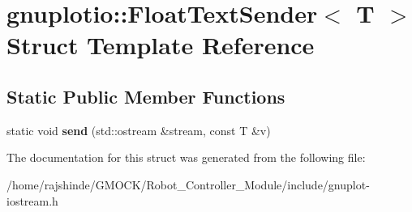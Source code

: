 \hypertarget{structgnuplotio_1_1_float_text_sender}{}\section{gnuplotio\+:\+:Float\+Text\+Sender$<$ T $>$ Struct Template Reference}
\label{structgnuplotio_1_1_float_text_sender}
\subsection*{Static Public Member Functions}
\begin{DoxyCompactItemize}
\item 
static void {\bfseries send} (std\+::ostream \&stream, const T \&v)\hypertarget{structgnuplotio_1_1_float_text_sender_aed6b6c3a95b1396688800d6d1f2fc299}{}\label{structgnuplotio_1_1_float_text_sender_aed6b6c3a95b1396688800d6d1f2fc299}

\end{DoxyCompactItemize}


The documentation for this struct was generated from the following file\+:\begin{DoxyCompactItemize}
\item 
/home/rajshinde/\+G\+M\+O\+C\+K/\+Robot\+\_\+\+Controller\+\_\+\+Module/include/gnuplot-\/iostream.\+h\end{DoxyCompactItemize}
